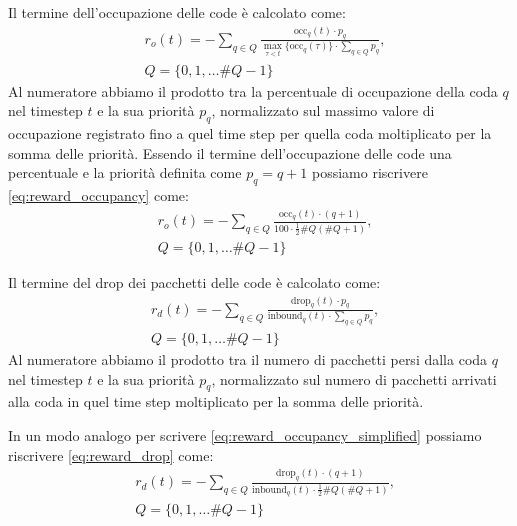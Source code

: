 \documentclass[conference]{IEEEtran}
\begin{document}
Il termine dell'occupazione delle code è calcolato come:
\begin{equation}
    \label{eq:reward_occupancy}
    \begin{aligned}
        & r_o(t) = -\sum_{q \in Q}\frac{\text{occ}_q(t) \cdot p_q}{\max_{\tau < t}\{\text{occ}_q(\tau)\} \cdot \sum_{q \in Q}p_q},\\
        & Q = \{0, 1, \dots \#Q - 1\} 
    \end{aligned}
\end{equation}
Al numeratore abbiamo il prodotto tra la percentuale di occupazione della coda $q$ nel 
timestep $t$ e la sua priorità $p_q$, normalizzato sul massimo valore di occupazione
registrato fino a quel time step per quella coda moltiplicato per la somma delle priorità. 
Essendo il termine dell'occupazione delle code una percentuale e la priorità definita
come $p_q = q + 1$ possiamo riscrivere \autoref{eq:reward_occupancy} come:
\begin{equation}
    \label{eq:reward_occupancy_simplified}
    \begin{aligned}
        & r_o(t) = -\sum_{q \in Q}\frac{\text{occ}_q(t) \cdot (q + 1)}{100 \cdot \frac{1}{2}\#Q(\#Q + 1)},\\
        & Q = \{0, 1, \dots \#Q - 1\} 
    \end{aligned}
\end{equation}

Il termine del drop dei pacchetti delle code è calcolato come:
\begin{equation}
    \label{eq:reward_drop}
    \begin{aligned}
        & r_d(t) = -\sum_{q \in Q}\frac{\text{drop}_q(t) \cdot p_q}{\text{inbound}_q(t) \cdot \sum_{q \in Q}p_q},\\
        & Q = \{0, 1, \dots \#Q - 1\} 
    \end{aligned}
\end{equation}
Al numeratore abbiamo il prodotto tra il numero di pacchetti persi dalla coda $q$ nel 
timestep $t$ e la sua priorità $p_q$, normalizzato sul numero di pacchetti arrivati alla coda in quel time step moltiplicato per la somma delle priorità.

In un modo analogo per scrivere \autoref{eq:reward_occupancy_simplified} possiamo
riscrivere \autoref{eq:reward_drop} come:
\begin{equation}
    \begin{aligned}
        & r_d(t) = -\sum_{q \in Q}\frac{\text{drop}_q(t) \cdot (q + 1)}{\text{inbound}_q(t) \cdot \frac{1}{2}\#Q(\#Q + 1)},\\
        & Q = \{0, 1, \dots \#Q - 1\} 
    \end{aligned}
\end{equation}
\end{document}
